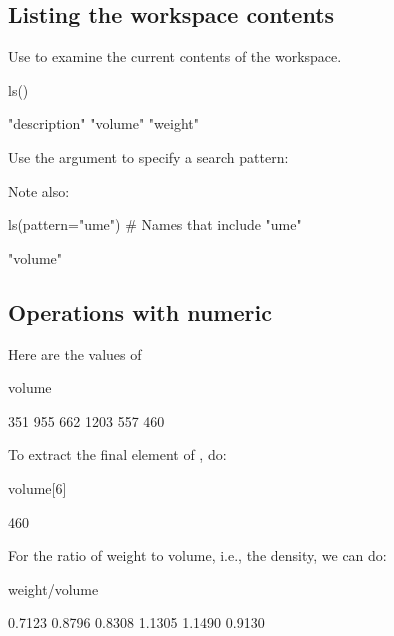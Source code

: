 \subsection*{Listing the workspace contents}

Use  to examine the current contents
of the workspace.
\begin{Schunk}
\begin{Sinput}
ls()
\end{Sinput}
\begin{Soutput}
[1] "description" "volume"      "weight"     
\end{Soutput}
\end{Schunk}
Use the argument  to specify a search pattern:
\begin{marginfigure}[40pt]
Note also:\\[-5pt]
\begin{Schunk}
\end{Schunk}
\end{marginfigure}
\begin{Schunk}
\begin{Sinput}
ls(pattern="ume")   # Names that include "ume"
\end{Sinput}
\begin{Soutput}
[1] "volume"
\end{Soutput}
\end{Schunk}

\subsection*{Operations with numeric }
Here are the values of 
\begin{Schunk}
\begin{Sinput}
volume
\end{Sinput}
\begin{Soutput}
[1]  351  955  662 1203  557  460
\end{Soutput}
\end{Schunk}

To extract the final element of , do:
\begin{Schunk}
\begin{Sinput}
volume[6]
\end{Sinput}
\begin{Soutput}
[1] 460
\end{Soutput}
\end{Schunk}
For the ratio of weight to volume, i.e., the density, we can do:
\begin{Schunk}
\begin{Sinput}
weight/volume
\end{Sinput}
\begin{Soutput}
[1] 0.7123 0.8796 0.8308 1.1305 1.1490 0.9130
\end{Soutput}
\end{Schunk}

